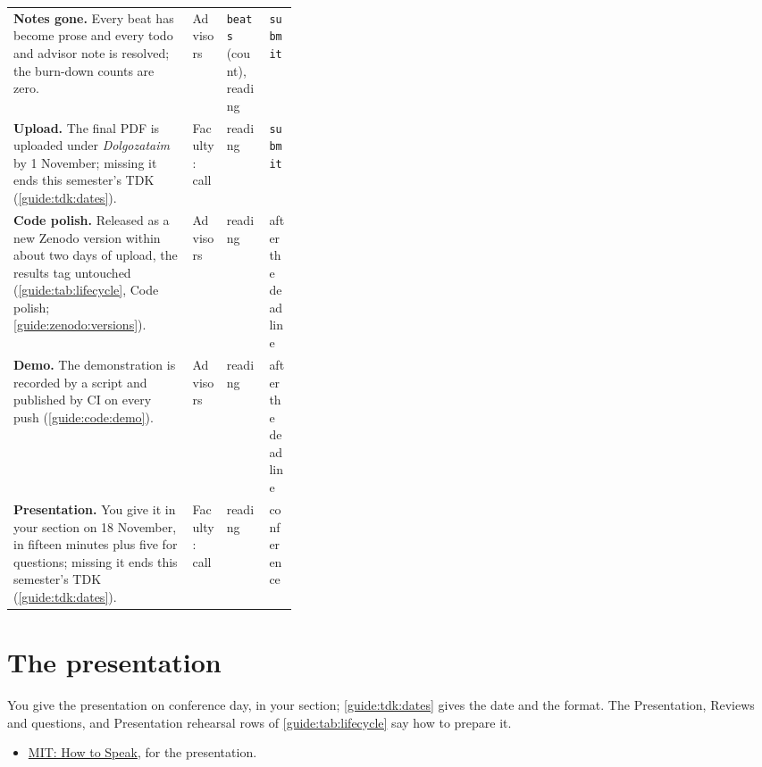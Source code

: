 {\begin{xltabular}{\linewidth}{X >{\raggedright\arraybackslash}p{0.12\linewidth} >{\raggedright\arraybackslash}p{0.15\linewidth} >{\raggedright\arraybackslash}p{0.1\linewidth}}
  \textbf{Notes gone.} Every beat has become prose and every todo and advisor note is resolved; the burn-down counts are zero. & Advisors & \texttt{beats} (count), reading & \texttt{submit} \\
  \textbf{Upload.} The final PDF is uploaded under \emph{Dolgozataim} by 1 November; missing it ends this semester's TDK (\cref{guide:tdk:dates}). & Faculty: call & reading & \texttt{submit} \\
  \textbf{Code polish.} Released as a new Zenodo version within about two days of upload, the results tag untouched (\cref{guide:tab:lifecycle}, Code polish; \cref{guide:zenodo:versions}). & Advisors & reading & after the deadline \\
  \textbf{Demo.} The demonstration is recorded by a script and published by CI on every push (\cref{guide:code:demo}). & Advisors & reading & after the deadline \\
  \textbf{Presentation.} You give it in your section on 18 November, in fifteen minutes plus five for questions; missing it ends this semester's TDK (\cref{guide:tdk:dates}). & Faculty: call & reading & conference \\
\end{xltabular}
}

\section{The presentation}\label{guide:lifecycle:presentation}
You give the presentation on conference day, in your section; \cref{guide:tdk:dates} gives the date and the format. The Presentation, Reviews and questions, and Presentation rehearsal rows of \cref{guide:tab:lifecycle} say how to prepare it.
\begin{itemize}
  \item \href{https://www.youtube.com/watch?v=Unzc731iCUY}{MIT: How to Speak}, for the presentation.
\end{itemize}
